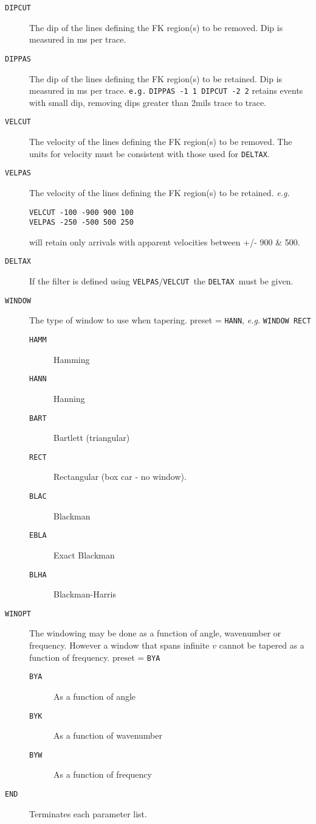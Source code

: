 \begin{description}
\item[\texttt{DIPCUT}] The dip of the lines defining the FK region(s) to be removed.
         Dip is measured in ms per trace.

\item[\texttt{DIPPAS}] The dip of the lines defining the FK region(s) to be retained.
         Dip is measured in ms per trace.
         \texttt{e.g.}  \texttt{DIPPAS -1 1 DIPCUT -2 2} retains events with small dip,
              removing dips greater than 2mils trace to trace.

\item[\texttt{VELCUT}] The velocity of the lines defining the FK region(s) to be
         removed. The units for velocity must be consistent with those
         used for \texttt{DELTAX}.

\item[\texttt{VELPAS}] The velocity of the lines defining the FK region(s) to be retained. \textit{e.g.} 
\begin{verbatim}
VELCUT -100 -900 900 100
VELPAS -250 -500 500 250
\end{verbatim}
will retain only arrivals with apparent velocities between +/- 900 \& 500.

\item[\texttt{DELTAX}] If the filter is defined using \texttt{VELPAS}/\texttt{VELCUT }the \texttt{DELTAX }must be given.

\item[\texttt{WINDOW}] The type of window to use when tapering.  \Gls{preset} = \texttt{HANN}, \textit{e.g.} \texttt{WINDOW RECT}
\begin{description}
       \item[\texttt{HAMM}] Hamming
       \item[\texttt{HANN}] Hanning
       \item[\texttt{BART}] Bartlett (triangular)
       \item[\texttt{RECT}] Rectangular (box car - no window).
       \item[\texttt{BLAC}] Blackman
       \item[\texttt{EBLA}] Exact Blackman
       \item[\texttt{BLHA}] Blackman-Harris
\end{description}

\item[\texttt{WINOPT}] The windowing may be done as a function of angle, wavenumber
         or frequency.  However a window that spans infinite $v$ cannot be
         tapered as a function of frequency.
         \Gls{preset} = \texttt{BYA}
\begin{description}
\item[\texttt{BYA}] As a function of angle
\item[\texttt{BYK}] As a function of wavenumber
\item[\texttt{BYW}] As a function of frequency
\end{description}

\item[\texttt{END}] Terminates each parameter list.
\end{description}

